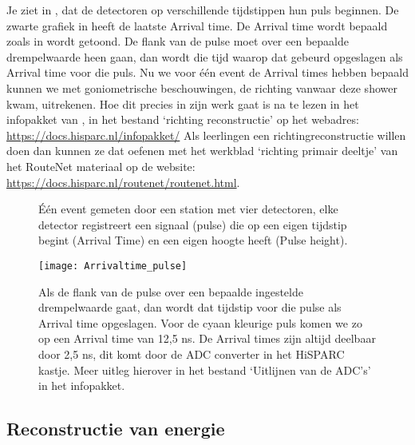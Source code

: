 Je ziet in , dat de detectoren op
verschillende tijdstippen hun puls beginnen. De zwarte grafiek in
 heeft de laatste Arrival time. De Arrival
time wordt bepaald zoals in  wordt getoond.
De flank van de pulse moet over een bepaalde drempelwaarde heen gaan,
dan wordt die tijd waarop dat gebeurd opgeslagen als Arrival time voor
die puls. Nu we voor één event de Arrival times hebben bepaald kunnen we
met goniometrische beschouwingen, de richting vanwaar deze shower kwam, uitrekenen.
Hoe dit precies in zijn werk gaat is na te lezen in het infopakket van
\hisparc, in het bestand `richting reconstructie' op het webadres:
\url{https://docs.hisparc.nl/infopakket/} Als leerlingen een richtingreconstructie willen doen
dan kunnen ze dat oefenen met het werkblad `richting primair deeltje' van het RouteNet
materiaal op de website: \url{https://docs.hisparc.nl/routenet/routenet.html}.

\begin{figure}
    \centering
    
    \caption{Één event gemeten door een station met vier detectoren, elke detector registreert
    een signaal (pulse) die op een eigen tijdstip begint (Arrival Time) en een eigen hoogte heeft
    (Pulse height).}
    \label{fig:traces}
\end{figure}


\begin{figure}
    \centering
    \texttt{[image: Arrivaltime\_pulse]}
    \caption{Als de flank van de pulse over een bepaalde ingestelde
    drempelwaarde gaat, dan wordt dat tijdstip voor die pulse als Arrival
    time opgeslagen. Voor de cyaan kleurige puls komen we zo op een Arrival
    time van 12,5 ns. De Arrival times zijn altijd deelbaar door 2,5 ns, dit
    komt door de ADC converter in het HiSPARC kastje. Meer uitleg hierover
    in het bestand `Uitlijnen van de ADC's' in het \hisparc infopakket.}
    \label{fig:Arrivaltime_pulse}
\end{figure}


\subsection{Reconstructie van energie }

